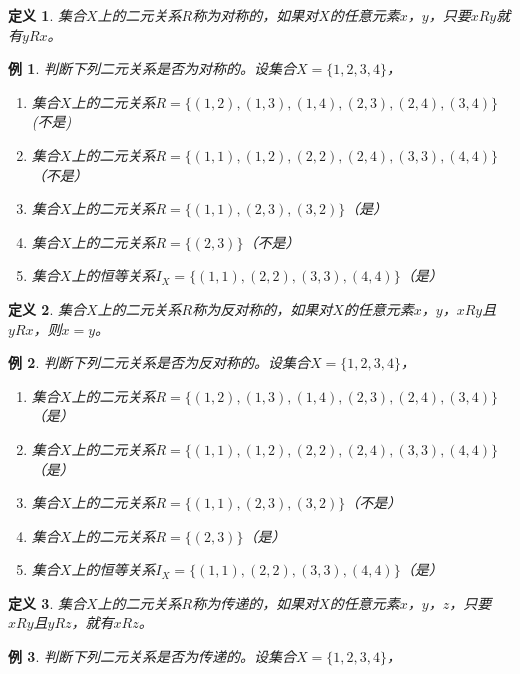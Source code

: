 \documentclass{book}[oneside]
\newtheorem{Def}{定义}[chapter]
\newtheorem{Example}{例}[chapter]
\begin{document}
\begin{CJK*}{UTF8}{gbsn}
  \begin{Def}
    集合$X$上的二元关系$R$称为对称的，如果对$X$的任意元素$x$，$y$，只要$xRy$就有$yRx$。
  \end{Def}
  \begin{Example}
    判断下列二元关系是否为对称的。设集合$X=\{1,2,3,4\}$，
  \begin{enumerate}
  \item 集合$X$上的二元关系$R=\{(1,2), (1,3), (1,4), (2,3),
    (2,4), (3,4)\}$(不是)
  \item 集合$X$上的二元关系$R=\{(1,1), (1,2), (2,2),
    (2,4), (3,3), (4,4)\}$（不是）
  \item 集合$X$上的二元关系$R = \{(1,1), (2,3), (3,2)\}$（是）
  \item 集合$X$上的二元关系$R = \{(2,3)\}$（不是）
  \item 集合$X$上的恒等关系$I_X = \{(1,1), (2,2), (3,3),(4,4)\}$（是）
  \end{enumerate}
\end{Example}
\begin{Def}
         集合$X$上的二元关系$R$称为反对称的，如果对$X$的任意元素$x$，$y$，$xRy$且$yRx$，则$x=y$。    
       \end{Def}
\begin{Example}
    判断下列二元关系是否为反对称的。设集合$X=\{1,2,3,4\}$，
  \begin{enumerate}
  \item 集合$X$上的二元关系$R=\{(1,2), (1,3), (1,4), (2,3),
    (2,4), (3,4)\}$（是）
  \item 集合$X$上的二元关系$R=\{(1,1), (1,2), (2,2),
    (2,4), (3,3), (4,4)\}$（是）
  \item 集合$X$上的二元关系$R = \{(1,1), (2,3), (3,2)\}$（不是）
  \item 集合$X$上的二元关系$R = \{(2,3)\}$（是）
  \item 集合$X$上的恒等关系$I_X = \{(1,1), (2,2), (3,3),(4,4)\}$（是）
  \end{enumerate}
\end{Example}
\begin{Def}
        集合$X$上的二元关系$R$称为传递的，如果对$X$的任意元素$x$，$y$，$z$，只要$xRy$且$yRz$，就有$xRz$。
      \end{Def}
      \begin{Example}
    判断下列二元关系是否为传递的。设集合$X=\{1,2,3,4\}$，

\end{Example}
\end{CJK*}
\end{document}
